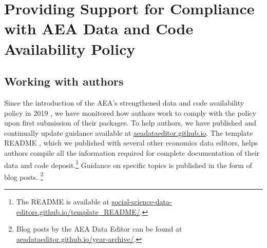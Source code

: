 
\section{Providing Support for Compliance with AEA Data and Code Availability Policy}
\label{sec:dcap}

\subsection{Working with authors}

Since the introduction of the \ac{AEA}'s strengthened data and code availability policy in 2019 \citep{10.1257/pandp.110.dcap}, we have monitored how authors work to comply with the policy upon first submission of their packages. To help authors, we have published and continually update guidance available at  \href{https://aeadataeditor.github.io/}{aeadataeditor.github.io}. The  template README \citep{READMEv1.1.0}, which we published with several other economics data editors,  helps authors compile all the information required for complete documentation of their data and code deposit.\footnote{The README is available at \href{https://social-science-data-editors.github.io/template_README/}{social-science-data-editors.github.io/template\_README/}.} Guidance on specific topics is published in the form of blog posts.%
\footnote{Blog posts by the AEA Data Editor can be found at \href{https://aeadataeditor.github.io/year-archive/}{aeadataeditor.github.io/year-archive/}.}
%


